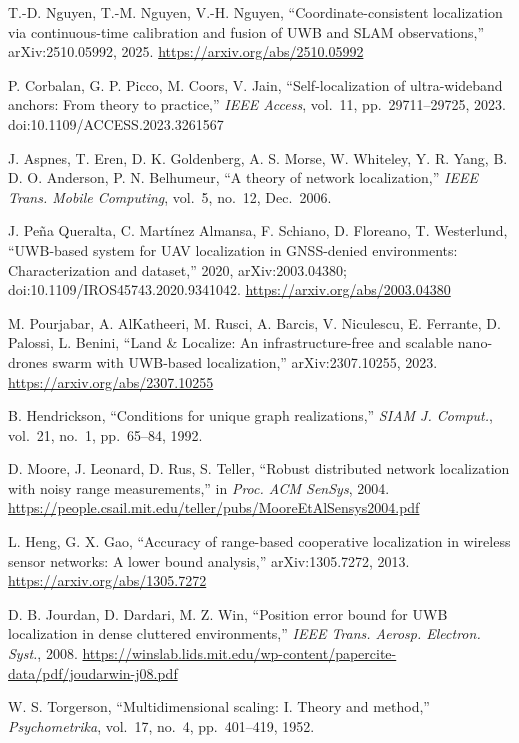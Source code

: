  T.-D. Nguyen, T.-M. Nguyen, V.-H. Nguyen, ``Coordinate-consistent localization via continuous-time calibration and fusion of UWB and SLAM observations,'' arXiv:2510.05992, 2025. \url{https://arxiv.org/abs/2510.05992}

 P. Corbalan, G. P. Picco, M. Coors, V. Jain, ``Self-localization of ultra-wideband anchors: From theory to practice,'' \emph{IEEE Access}, vol.~11, pp.~29711--29725, 2023. doi:10.1109/ACCESS.2023.3261567

 J. Aspnes, T. Eren, D. K. Goldenberg, A. S. Morse, W. Whiteley, Y. R. Yang, B. D. O. Anderson, P. N. Belhumeur, ``A theory of network localization,'' \emph{IEEE Trans. Mobile Computing}, vol.~5, no.~12, Dec.\ 2006.

 J. Pe\~na Queralta, C. Mart\'inez Almansa, F. Schiano, D. Floreano, T. Westerlund, ``UWB-based system for UAV localization in GNSS-denied environments: Characterization and dataset,'' 2020, arXiv:2003.04380; doi:10.1109/IROS45743.2020.9341042. \url{https://arxiv.org/abs/2003.04380}

 M. Pourjabar, A. AlKatheeri, M. Rusci, A. Barcis, V. Niculescu, E. Ferrante, D. Palossi, L. Benini, ``Land \& Localize: An infrastructure-free and scalable nano-drones swarm with UWB-based localization,'' arXiv:2307.10255, 2023. \url{https://arxiv.org/abs/2307.10255}

 B. Hendrickson, ``Conditions for unique graph realizations,'' \emph{SIAM J. Comput.}, vol.~21, no.~1, pp.~65--84, 1992.

 D. Moore, J. Leonard, D. Rus, S. Teller, ``Robust distributed network localization with noisy range measurements,'' in \emph{Proc. ACM SenSys}, 2004. \url{https://people.csail.mit.edu/teller/pubs/MooreEtAlSensys2004.pdf}

 L. Heng, G. X. Gao, ``Accuracy of range-based cooperative localization in wireless sensor networks: A lower bound analysis,'' arXiv:1305.7272, 2013. \url{https://arxiv.org/abs/1305.7272}

 D. B. Jourdan, D. Dardari, M. Z. Win, ``Position error bound for UWB localization in dense cluttered environments,'' \emph{IEEE Trans. Aerosp. Electron. Syst.}, 2008. \url{https://winslab.lids.mit.edu/wp-content/papercite-data/pdf/joudarwin-j08.pdf}

 W. S. Torgerson, ``Multidimensional scaling: I. Theory and method,'' \emph{Psychometrika}, vol.~17, no.~4, pp.~401--419, 1952.


